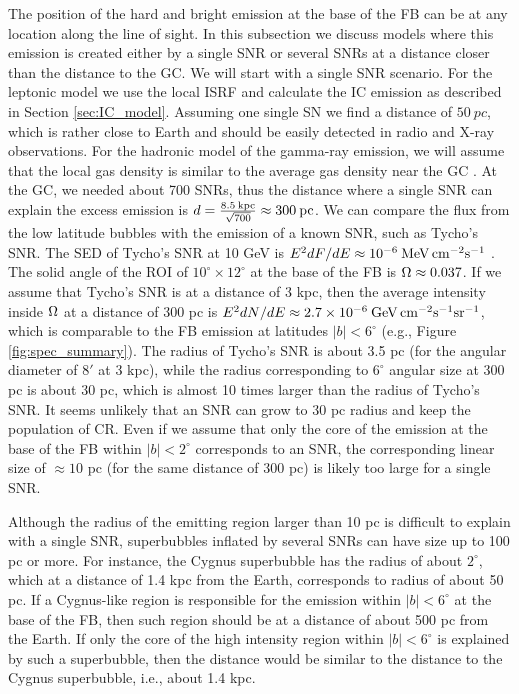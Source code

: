 The position of the hard and bright emission at the base of the FB can be at any location along the line of sight.
In this subsection we discuss models where this emission is created either by a single SNR
or several SNRs at a distance closer than the distance to the GC.
We will start with a single SNR scenario.
For the leptonic model we use the local ISRF and calculate the IC emission as described in Section \ref{sec:IC_model}.
Assuming one single SN we find a distance of $\SI{50}{pc}$, which is rather close to Earth and should 
be easily detected in radio and X-ray observations.
For the hadronic model of the gamma-ray emission, we will assume that 
the local gas density is similar to the average gas density near the GC \citep{2017ApJ...834...57M}.
At the GC, we needed about 700 SNRs, thus the distance where a single SNR can explain the excess emission
is $d = \frac{8.5\: {\rm kpc}}{\sqrt{700}} \approx 300\:{\rm pc}$.
We can compare the flux from the low latitude bubbles with the emission of a known SNR, such as Tycho's SNR.
The SED of Tycho's SNR at 10 GeV is $E^2 {dF}/{dE} \approx 10^{-6}\: {\rm MeV\, cm^{-2} s^{-1}}$ \citep{2017ApJ...836...23A}.
The solid angle of the ROI of $10^\circ \times 12^\circ$ at the base of the FB is $\Omega \approx 0.037$.
If we assume that Tycho's SNR is at a distance of 3 kpc, then the average intensity inside $\Omega$ at a distance of 300 pc
is $E^2 {dN}/{dE} \approx 2.7 \times 10^{-6}\: {\rm GeV\, cm^{-2} s^{-1} sr^{-1}}$, which is comparable to the 
FB emission at latitudes $|b| < 6^\circ$ (e.g., Figure \ref{fig:spec_summary}).
The radius of Tycho's SNR is about 3.5 pc (for the angular diameter of $8'$ at 3 kpc),
while the radius corresponding to $6^\circ$ angular size at 300 pc is about 30 pc, which is almost 10 times larger than the radius of Tycho's SNR.
It seems unlikely that an SNR can grow to 30 pc radius and keep the population of CR.
Even if we assume that only the core of the emission at the base of the FB within $|b| < 2^\circ$ corresponds to an SNR,
the corresponding linear size of $\approx 10$ pc (for the same distance of 300 pc) is likely too large for a single SNR.

Although the radius of the emitting region larger than 10 pc is difficult to explain with a single SNR,
superbubbles inflated by several SNRs can have size up to 100 pc or more.
For instance, the Cygnus superbubble \citep{2011Sci...334.1103A} has the radius of about $2^\circ$, 
which at a distance of 1.4 kpc from the Earth, corresponds to radius of about 50 pc.
If a Cygnus-like region is responsible for the emission within $|b| < 6^\circ$ at the base of the FB,
then such region should be at a distance of about 500 pc from the Earth.
If only the core of the high intensity region within $|b| < 6^\circ$ is explained by such a superbubble,
then the distance would be similar to the distance to the Cygnus superbubble, i.e., about 1.4 kpc.

